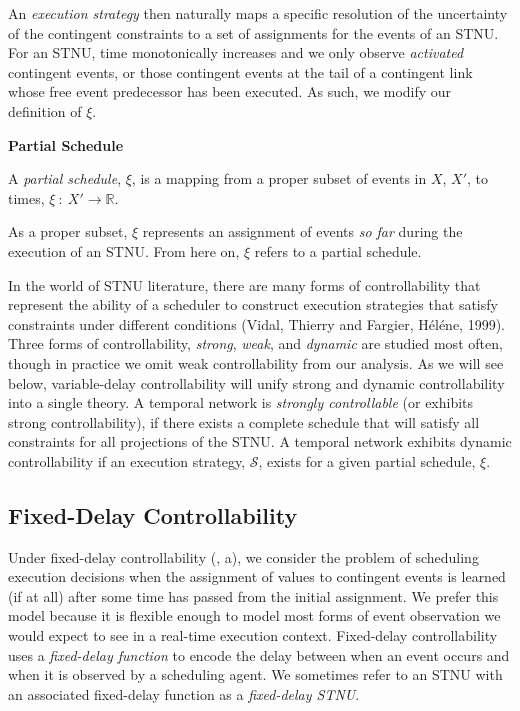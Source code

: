 \documentclass[11pt]{article}
\begin{document}
An \emph{execution strategy} then naturally maps a specific resolution of the uncertainty of the
contingent constraints to a set of assignments for the events of an STNU. For an STNU, time
monotonically increases and we only observe \emph{activated} contingent events, or those contingent
events at the tail of a contingent link whose free event predecessor has been executed. As such, we
modify our definition of \(\xi\).

\begin{defn}
\textbf{Partial Schedule}

A \emph{partial schedule}, \(\xi\), is a mapping from a proper subset of events in \(X\), \(X'\), to times,
\(\xi~:~X' \rightarrow \mathbb{R}\).
\end{defn}

As a proper subset, \(\xi\) represents an assignment of events \emph{so far} during the execution of an
STNU. From here on, \(\xi\) refers to a partial schedule.

In the world of STNU literature, there are many forms of controllability that represent the ability
of a scheduler to construct execution strategies that satisfy constraints under different conditions
(Vidal, Thierry and Fargier, H{\'e}l{\'e}ne, 1999). Three forms of controllability, \emph{strong}, \emph{weak}, and \emph{dynamic} are studied most
often, though in practice we omit weak controllability from our analysis. As we will see below,
variable-delay controllability will unify strong and dynamic controllability into a single theory. A
temporal network is \emph{strongly controllable} (or exhibits strong controllability), if there exists a
complete schedule that will satisfy all constraints for all projections of the STNU. A temporal
network exhibits dynamic controllability if an execution strategy, \(\mathcal{S}\), exists for a given
partial schedule, \(\xi\).

\subsection{Fixed-Delay Controllability}
\label{sec:orgb02dc81}
\label{sec:fdc}

Under fixed-delay controllability (, a), we consider the problem of scheduling
execution decisions when the assignment of values to contingent events is learned (if at all) after
some time has passed from the initial assignment. We prefer this model because it is flexible enough
to model most forms of event observation we would expect to see in a real-time execution context.
Fixed-delay controllability uses a \emph{fixed-delay function} to encode the delay between when an event
occurs and when it is observed by a scheduling agent. We sometimes refer to an STNU with an
associated fixed-delay function as a \emph{fixed-delay STNU}.
\end{document}
